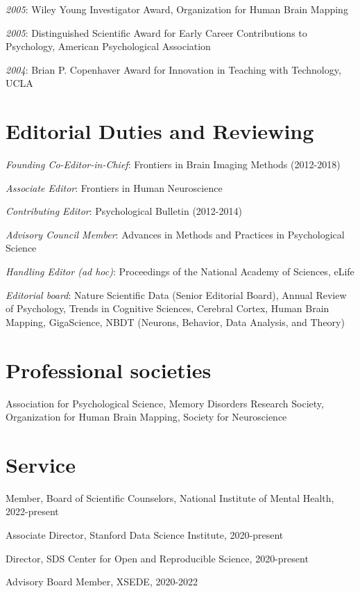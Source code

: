 \documentclass[10pt, letterpaper]{article}
\begin{document}
\textit{2005}: Wiley Young Investigator Award, Organization for Human Brain Mapping

\textit{2005}: Distinguished Scientific Award for Early Career Contributions to Psychology, American Psychological Association

\textit{2004}: Brian P. Copenhaver Award for Innovation in Teaching with Technology, UCLA

\section*{Editorial Duties and Reviewing} 
\noindent 

\textit{Founding Co-Editor-in-Chief}: Frontiers in Brain Imaging Methods (2012-2018) 

\textit{Associate Editor}: Frontiers in Human Neuroscience 

\textit{Contributing Editor}: Psychological Bulletin (2012-2014) 

\textit{Advisory Council Member}: Advances in Methods and Practices in Psychological Science 

\textit{Handling Editor (ad hoc)}: Proceedings of the National Academy of Sciences, eLife 

\textit{Editorial board}: Nature Scientific Data (Senior Editorial Board), Annual Review of Psychology, Trends in Cognitive Sciences, Cerebral Cortex, Human Brain Mapping, GigaScience, NBDT (Neurons, Behavior, Data Analysis, and Theory) 

\section*{Professional societies}
\noindent

Association for Psychological Science, Memory Disorders Research Society, Organization for Human Brain Mapping, Society for Neuroscience

\section*{Service}
\noindent

Member, Board of Scientific Counselors, National Institute of Mental Health, 2022-present 

Associate Director, Stanford Data Science Institute, 2020-present 

Director, SDS Center for Open and Reproducible Science, 2020-present 

Advisory Board Member, XSEDE, 2020-2022 
\end{document}
